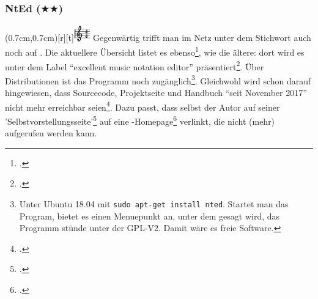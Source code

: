 %
%
%



\subsubsection{NtEd ($\bigstar$$\bigstar$)}


\parpic(0.7cm,0.7cm)[r][t]{\includegraphics[width=0.7cm]{logos/nted-300dpi.png}}
\label{NtEd}Gegenwärtig trifft man im Netz unter dem Stichwort
 auch noch auf . Die aktuellere Übersicht
listet es ebenso\footcite[vgl.][\nopage wp]{WpedNotensatz2019a}, wie die ältere:
dort wird es unter dem Label \enquote{excellent music notation editor}
präsentiert\footcite[vgl.][\nopage wp]{LinuxSoundNotation2006a}. Über
Distributionen ist das Programm noch zugänglich\footnote{Unter Ubuntu 18.04 mit
\texttt{sudo apt-get install nted}. Startet man das Program, bietet es einen
Menuepunkt  an, unter dem gesagt wird, das Programm stünde unter der
GPL-V2. Damit wäre es freie Software.}. Gleichwohl wird schon darauf
hingewiesen, dass Sourcecode, Projektseite und Handbuch \enquote{seit November
2017} nicht mehr erreichbar seien\footcite[vgl.][\nopage wp]{UbuntuNtEd2016a}.
Dazu passt, dass selbst der Autor  auf seiner
'Selbstvorstellungsseite'\footcite[vgl.][\nopage wp]{Andres2018a} auf eine
-Homepage\footcite[vgl.][\nopage wp]{Andres2018b} verlinkt, die nicht
(mehr) aufgerufen werden kann.
 
